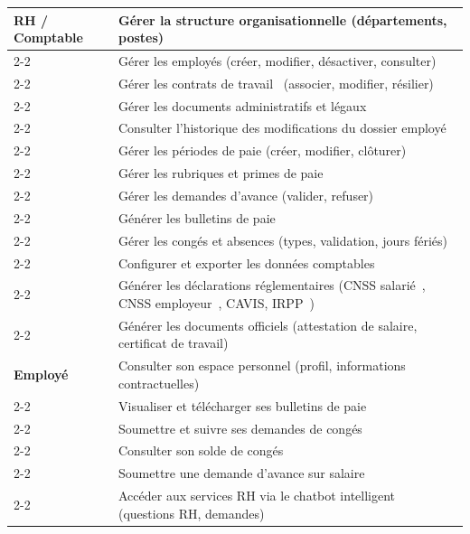\begin{longtable}{|p{3.5cm}|p{\dimexpr\linewidth-3.5cm-4\tabcolsep-2\arrayrulewidth}|}
\textbf{RH / Comptable}
    & Gérer la structure organisationnelle (départements, postes) \\ \cline{2-2}
    & Gérer les employés (créer, modifier, désactiver, consulter) \\ \cline{2-2}
    & Gérer les contrats de travail~\cite{cdt} (associer, modifier, résilier) \\ \cline{2-2}
    & Gérer les documents administratifs et légaux \\ \cline{2-2}
    & Consulter l'historique des modifications du dossier employé \\ \cline{2-2}
    & Gérer les périodes de paie (créer, modifier, clôturer) \\ \cline{2-2}
    & Gérer les rubriques et primes de paie \\ \cline{2-2}
    & Gérer les demandes d'avance (valider, refuser) \\ \cline{2-2}
    & Générer les bulletins de paie~\cite{loifinance} \\ \cline{2-2}
    & Gérer les congés et absences (types, validation, jours fériés) \\ \cline{2-2}
    & Configurer et exporter les données comptables \\ \cline{2-2}
    & Générer les déclarations réglementaires (CNSS salarié~\cite{cnss_reg}, CNSS employeur~\cite{cnss_reg}, CAVIS, IRPP~\cite{loifinance}) \\ \cline{2-2}
    & Générer les documents officiels (attestation de salaire, certificat de travail) \\ \hline

\textbf{Employé}
    & Consulter son espace personnel (profil, informations contractuelles) \\ \cline{2-2}
    & Visualiser et télécharger ses bulletins de paie \\ \cline{2-2}
    & Soumettre et suivre ses demandes de congés \\ \cline{2-2}
    & Consulter son solde de congés \\ \cline{2-2}
    & Soumettre une demande d'avance sur salaire \\ \cline{2-2}
    & Accéder aux services RH via le chatbot intelligent~\cite{chatbot_hr,rag_paper} (questions RH, demandes) \\ \hline

\end{longtable}

